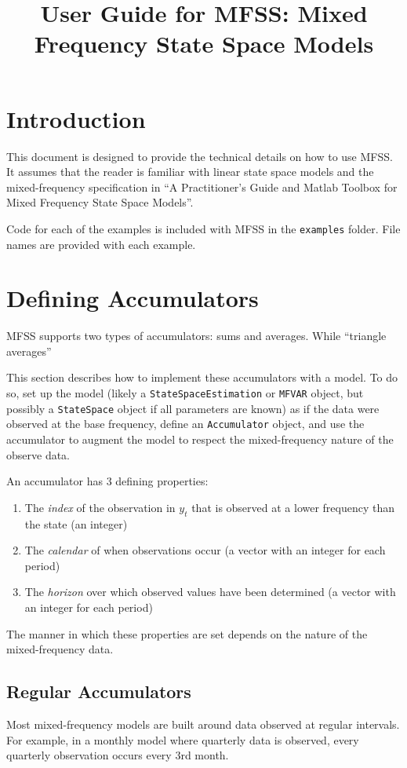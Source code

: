 \documentclass{article}
\title{User Guide for MFSS: Mixed Frequency State Space Models}
\begin{document}
\maketitle
\tableofcontents 

\section{Introduction}

This document is designed to provide the technical details on how to use MFSS. It assumes that the reader is familiar with linear state space models and the mixed-frequency specification in  ``A Practitioner's Guide and Matlab Toolbox for Mixed Frequency State Space Models''. 

Code for each of the examples is included with MFSS in the \texttt{examples} folder. File names are provided with each example. 

\section{Defining Accumulators}

MFSS supports two types of accumulators: sums and averages. While ``triangle averages'' 

This section describes how to implement these accumulators with a model. To do so, set up the model (likely a \texttt{StateSpaceEstimation} or \texttt{MFVAR} object, but possibly a \texttt{StateSpace} object if all parameters are known) as if the data were observed at the base frequency, define an \texttt{Accumulator} object, and use the accumulator to augment the model to respect the mixed-frequency nature of the observe data.

An accumulator has 3 defining properties: 
\begin{enumerate}
  \item The \emph{index} of the observation in $y_t$ that is observed at a lower frequency than the state (an integer)
  \item The \emph{calendar} of when observations occur (a vector with an integer for each period)
  \item The \emph{horizon} over which observed values have been determined (a vector with an integer for each period)
\end{enumerate}

The manner in which these properties are set depends on the nature of the mixed-frequency data. 

\subsection{Regular Accumulators}
Most mixed-frequency models are built around data observed at regular intervals. For example, in a monthly model where quarterly data is observed, every quarterly observation occurs every 3rd month. 
\end{document}
